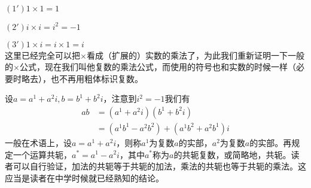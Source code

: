 \documentclass[11pt,a4paper,openany]{book}%
\theoremstyle{plain}%
\newcommand{\NO}[1]{{$(#1)$}}%
\begin{document}
\NO{1'}$1\times 1=1$

\NO{2'}$i\times i=i^2=-1$

\NO{3'}$1\times i=i \times 1=i$\\
这里已经完全可以把$\times$看成（扩展的）实数的乘法了，为此我们重新证明一下一般的$\times$公式，现在我们叫他复数的乘法公式，而使用的符号也和实数的时候一样（必要时略去），也不再用粗体标识复数。

设$a=a^1+a^2i,b=b^1+b^2i$，注意到$i^2=-1$我们有
\begin{equation*}
\begin{split}
ab&=(a^1+a^2i)(b^1+b^2i)\\
&=(a^1b^1-a^2b^2)+(a^1b^2+a^2b^1)i
\end{split}
\end{equation*}
一般在术语上，设$a=a^1+a^2i$，则称$a^1$为复数$a$的实部，$a^2$为复数$a$的实部。再规定一个运算共轭，$a^*=a^1-a^2i$，其中$a^*$称为$a$的共轭复数，或简略地，共轭。读者可以自行验证，加法的共轭等于共轭的加法，乘法的共轭也等于共轭的乘法。这应当是读者在中学时候就已经熟知的结论。
\end{document}
